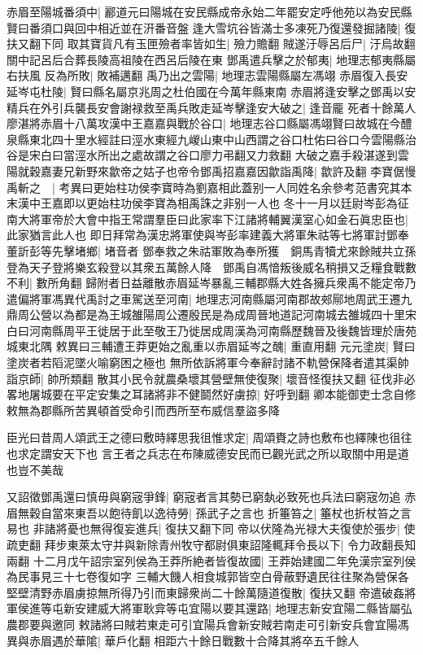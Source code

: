 赤眉至陽城番須中|{
	酈道元曰陽城在安民縣成帝永始二年罷安定呼他苑以為安民縣賢曰番須口與回中相近並在汧番音盤}
逢大雪坑谷皆滿士多凍死乃復還發掘諸陵|{
	復扶又翻下同}
取其寶貨凡有玉匣殮者率皆如生|{
	殮力贍翻}
賊遂汙辱呂后尸|{
	汙烏故翻關中記呂后合葬長陵高祖陵在西呂后陵在東}
鄧禹遣兵擊之於郁夷|{
	地理志郁夷縣屬右扶風}
反為所敗|{
	敗補邁翻}
禹乃出之雲陽|{
	地理志雲陽縣屬左馮翊}
赤眉復入長安延岑屯杜陵|{
	賢曰縣名屬京兆周之杜伯國在今萬年縣東南}
赤眉將逢安擊之鄧禹以安精兵在外引兵襲長安會謝禄救至禹兵敗走延岑擊逢安大破之|{
	逢音龎}
死者十餘萬人廖湛將赤眉十八萬攻漢中王嘉嘉與戰於谷口|{
	地理志谷口縣屬馮翊賢曰故城在今醴泉縣東北四十里水經註曰涇水東經九嵕山東中山西謂之谷口杜佑曰谷口今雲陽縣治谷是宋白曰當涇水所出之處故謂之谷口廖力弔翻又力救翻}
大破之嘉手殺湛遂到雲陽就穀嘉妻兄新野來歙帝之姑子也帝令鄧禹招嘉嘉因歙詣禹降|{
	歙許及翻}
李寶倨慢禹斬之　|{
	考異曰更始柱功侯李寶時為劉嘉相此蓋别一人同姓名余參考范書究其本末漢中王嘉即以更始柱功侯李寶為相禹誅之非别一人也}
冬十一月以廷尉岑彭為征南大將軍帝於大會中指王常謂羣臣曰此家率下江諸將輔翼漢室心如金石眞忠臣也|{
	此家猶言此人也}
即日拜常為漢忠將軍使與岑彭率建義大將軍朱祜等七將軍討鄧奉董訢彭等先擊堵鄉|{
	堵音者}
鄧奉救之朱祜軍敗為奉所獲　銅馬青犢尤來餘賊共立孫登為天子登將樂玄殺登以其衆五萬餘人降　鄧禹自馮愔叛後威名稍損又乏糧食戰數不利|{
	數所角翻}
歸附者日益離散赤眉延岑暴亂三輔郡縣大姓各擁兵衆禹不能定帝乃遣偏將軍馮異代禹討之車駕送至河南|{
	地理志河南縣屬河南郡故郟鄏地周武王遷九鼎周公營以為都是為王城雒陽周公遷殷民是為成周晉地道記河南城去雒城四十里宋白曰河南縣周平王徙居于此至敬王乃徙居成周漢為河南縣歷魏晉及後魏皆理於唐苑城東北隅}
敕異曰三輔遭王莽更始之亂重以赤眉延岑之醜|{
	重直用翻}
元元塗炭|{
	賢曰塗炭者若䧟泥墜火喻窮困之極也}
無所依訴將軍今奉辭討諸不軌營保降者遣其渠帥詣京師|{
	帥所類翻}
散其小民令就農桑壞其營壁無使復聚|{
	壞音怪復扶又翻}
征伐非必畧地屠城要在平定安集之耳諸將非不健鬬然好虜掠|{
	好呼到翻}
卿本能御吏士念自修敕無為郡縣所苦異頓首受命引而西所至布威信羣盜多降

臣光曰昔周人頌武王之德曰敷時繹思我徂惟求定|{
	周頌賚之詩也敷布也繹陳也徂往也求定謂安天下也}
言王者之兵志在布陳威德安民而已觀光武之所以取關中用是道也豈不美哉

又詔徵鄧禹還曰慎毋與窮宼爭鋒|{
	窮宼者言其勢已窮埶必致死也兵法曰窮宼勿追}
赤眉無穀自當來東吾以飽待飢以逸待勞|{
	孫武子之言也}
折箠笞之|{
	箠杖也折杖笞之言易也}
非諸將憂也無得復妄進兵|{
	復扶又翻下同}
帝以伏隆為光禄大夫復使於張步|{
	使疏吏翻}
拜步東萊太守并與新除青州牧守都尉俱東詔隆輒拜令長以下|{
	令力政翻長知兩翻}
十二月戊午詔宗室列侯為王莽所絶者皆復故國|{
	王莽始建國二年免漢宗室列侯為民事見三十七卷復如字}
三輔大饑人相食城郭皆空白骨蔽野遺民往往聚為營保各堅壁清野赤眉虜掠無所得乃引而東歸衆尚二十餘萬隨道復散|{
	復扶又翻}
帝遣破姦將軍侯進等屯新安建威大將軍耿弇等屯宜陽以要其還路|{
	地理志新安宜陽二縣皆屬弘農郡要與邀同}
敕諸將曰賊若東走可引宜陽兵會新安賊若南走可引新安兵會宜陽馮異與赤眉遇於華隂|{
	華戶化翻}
相距六十餘日戰數十合降其將卒五千餘人

